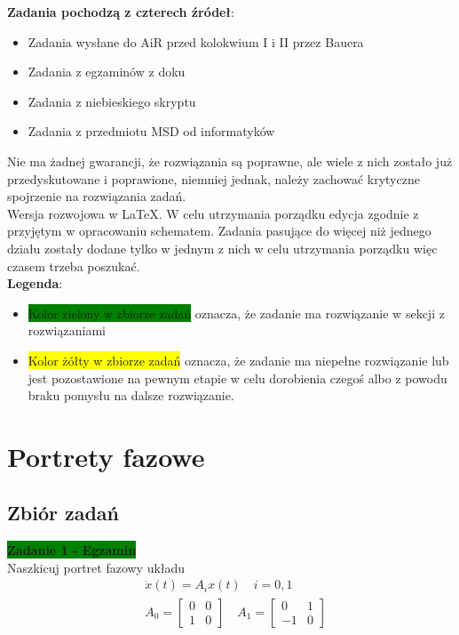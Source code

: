 \documentclass[a4paper,11pt]{article}
\begin{document}
\tableofcontents

\newpage

\textbf{Zadania pochodzą z czterech źródeł}:
\begin{itemize}
\item Zadania wysłane do AiR przed kolokwium I i II przez Bauera
\item Zadania z egzaminów z doku
\item Zadania z niebieskiego skryptu
\item Zadania z przedmiotu MSD od informatyków
\end{itemize}

Nie ma żadnej gwarancji, że rozwiązania są poprawne, ale wiele z nich zostało już przedyskutowane i poprawione, niemniej jednak, należy zachować krytyczne spojrzenie na rozwiązania zadań. \\
Wersja rozwojowa w \LaTeX . W celu utrzymania porządku edycja zgodnie z przyjętym w opracowaniu schematem. Zadania pasujące do więcej niż jednego działu zostały dodane tylko w jednym z nich w celu utrzymania porządku więc czasem trzeba poszukać. \\
\textbf{Legenda}:
\begin{itemize}
\item \colorbox{green}{Kolor zielony w zbiorze zadań} oznacza, że zadanie ma rozwiązanie w sekcji z rozwiązaniami
\item \colorbox{yellow}{Kolor żółty w zbiorze zadań} oznacza, że zadanie ma niepełne rozwiązanie lub jest pozostawione na pewnym etapie w celu dorobienia czegoś albo z powodu braku pomysłu na dalsze rozwiązanie. 
\end{itemize}

\newpage
\pagestyle{mypage}
\section{Portrety fazowe}
\subsection{Zbiór zadań}
\begin{framed}
\textbf{\colorbox{green}{Zadanie 1 - Egzamin} } \\ 
Naszkicuj portret fazowy układu
\begin{align*}
&\dot{x}(t)=A_{i}x(t) \quad
i = 0,1 \\
&A_{0} = 
\begin{bmatrix}
0 & 0 \\
1 & 0
\end{bmatrix}
\quad
A_{1} = 
\begin{bmatrix}
0 & 1 \\
-1 & 0
\end{bmatrix}
\end{align*}
\end{framed}
\end{document}

